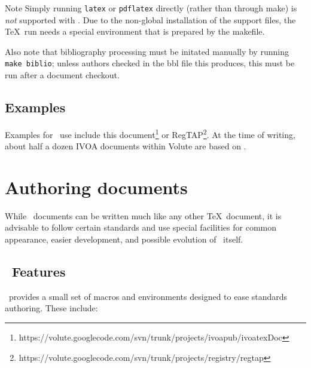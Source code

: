 \documentclass[11pt,a4paper]{ivoa}
\begin{document}
\begin{admonition}{Note}
Simply running \texttt{latex} or \texttt{pdflatex} directly
(rather than through make) is \emph{not} supported with \ivoatex.  Due
to the non-global installation of the support files, the \TeX\ run needs
a special environment that is prepared by the makefile.

Also note that bibliography processing must be initated manually by
running \texttt{make biblio}; unless authors checked in the bbl file
this produces, this must be run after a document checkout.
\end{admonition}

\subsection{Examples}

Examples for \ivoatex\ use include this 
document\footnote{https://volute.googlecode.com/svn/trunk/projects/ivoapub/ivoatexDoc}
or
RegTAP\footnote{https://volute.googlecode.com/svn/trunk/projects/registry/regtap}.
At the time of writing, about half a dozen IVOA documents within Volute
are based on \ivoatex.


\section{Authoring documents}
\label{sect:authoring}

While \ivoatex\ documents can be written much like any other \TeX\
document, it is advisable to follow certain standards and use special
facilities for common appearance, easier development, and possible
evolution of \ivoatex\ itself.

\subsection{\ivoatex\ Features}

\ivoatex\ provides a small set of macros and environments designed
to ease standards authoring.  These include:
\end{document}
